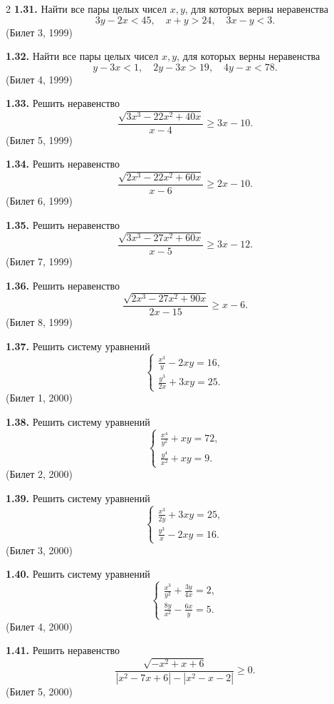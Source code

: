 \documentclass[14pt,a4paper,landscape]{extarticle}
\begin{document}
\begin{multicols}{2}
\textbf{1.31.} Найти все пары целых чисел \(x, y\), для которых верны неравенства
\[
3y - 2x < 45, \quad x + y > 24, \quad 3x - y < 3.
\]
\hfill \textnormal{(Билет 3, 1999)}

\textbf{1.32.} Найти все пары целых чисел \(x, y\), для которых верны неравенства
\[
y - 3x < 1, \quad 2y - 3x > 19, \quad 4y - x < 78.
\]
\hfill \textnormal{(Билет 4, 1999)}

\textbf{1.33.} Решить неравенство
\[
\frac{\sqrt{3x^3 - 22x^2 + 40x}}{x - 4} \geqslant 3x - 10.
\]
\hfill \textnormal{(Билет 5, 1999)}

\textbf{1.34.} Решить неравенство
\[
\frac{\sqrt{2x^3 - 22x^2 + 60x}}{x - 6} \geqslant 2x - 10.
\]
\hfill \textnormal{(Билет 6, 1999)}

\textbf{1.35.} Решить неравенство
\[
\frac{\sqrt{3x^3 - 27x^2 + 60x}}{x - 5} \geqslant 3x - 12.
\]
\hfill \textnormal{(Билет 7, 1999)}

\textbf{1.36.} Решить неравенство
\[
\frac{\sqrt{2x^3 - 27x^2 + 90x}}{2x - 15} \geqslant x - 6.
\]
\hfill \textnormal{(Билет 8, 1999)}

\textbf{1.37.} Решить систему уравнений
\[
\begin{cases}
\frac{x^3}{y} - 2xy = 16, \\[1ex]
\frac{y^3}{2x} + 3xy = 25.
\end{cases}
\]
\hfill \textnormal{(Билет 1, 2000)}

\textbf{1.38.} Решить систему уравнений
\[
\begin{cases}
\frac{x^4}{y^2} + xy = 72, \\[1ex]
\frac{y^4}{x^2} + xy = 9.
\end{cases}
\]
\hfill \textnormal{(Билет 2, 2000)}

\textbf{1.39.} Решить систему уравнений
\[
\begin{cases}
\frac{x^3}{2y} + 3xy = 25, \\[1ex]
\frac{y^3}{x} - 2xy = 16.
\end{cases}
\]
\hfill \textnormal{(Билет 3, 2000)}

\textbf{1.40.} Решить систему уравнений
\[
\begin{cases}
\frac{x^3}{y^2} + \frac{3y}{4x} = 2, \\[1ex]
\frac{8y}{x^2} - \frac{6x}{y} = 5.
\end{cases}
\]
\hfill \textnormal{(Билет 4, 2000)}

\textbf{1.41.} Решить неравенство
\[
\frac{\sqrt{-x^2 + x + 6}}{|x^2 - 7x + 6| - |x^2 - x - 2|} \geqslant 0.
\]
\hfill \textnormal{(Билет 5, 2000)}


\end{multicols}
\end{document}
